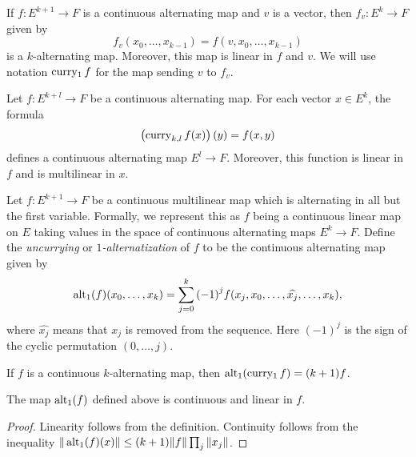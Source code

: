 \begin{definition}%
  \label{def:cont-alt-curry-fin}
  If \(f\colon E^{k + 1} \to F\) is a continuous alternating map and \(v\) is a vector,
  then \(f_{v}\colon E^{k} \to F\) given by
  \[
    f_{v}(x_{0}, \dots, x_{k - 1})=f(v, x_{0}, \dots, x_{k - 1})
  \]
  is a \(k\)-alternating map.
  Moreover, this map is linear in \(f\) and \(v\).
  We will use notation \(\operatorname{curry_1} f\) for the map sending \(v\) to \(f_{v}\).
\end{definition}

\begin{definition}%
  \label{def:cont-alt-curry-fin-add}
  Let \(f\colon E^{k + l} \to F\) be a continuous alternating map.
  For each vector \(x \in E^{k}\), the formula
  \[
    \left(\operatorname{curry}_{k,l} f(x)\right)(y) = f(x, y)
  \]
  defines a continuous alternating map \(E^{l}\to F\).
  Moreover, this function is linear in \(f\) and is multilinear in \(x\).
\end{definition}

\begin{definition}%
  \label{def:alt-one}
  Let \(f\colon E^{k + 1}\to F\) be a continuous multilinear map which is alternating in all but the first variable.
  Formally, we represent this as \(f\) being a continuous linear map on \(E\) taking values in the space of continuous alternating maps \(E^{k}\to F\).
  Define the \emph{uncurrying} or \emph{\(1\)-alternatization} of \(f\) to be the continuous alternating map given by
  \[
    \operatorname{alt_1}(f)(x_{0}, \dots, x_{k}) = \sum_{j=0}^{k}{(-1)}^{j}f(x_{j}, x_{0}, \dots, \widehat{x_{j}}, \dots, x_{k}),
  \]
  where \(\widehat{x_{j}}\) means that \(x_{j}\) is removed from the sequence.
  Here \({(-1)}^{j}\) is the sign of the cyclic permutation \((0, \dots, j)\).
\end{definition}

\begin{theorem}%
  \label{thm:uncurry-curry-one}
  If \(f\) is a continuous \(k\)-alternating map, then \(\operatorname{alt_1}(\operatorname{curry_1} f) = (k + 1)f\).
\end{theorem}

\begin{lemma}%
  \label{lem:alt-one-linear}
  The map \(\operatorname{alt_1}(f)\) defined above is continuous and linear in \(f\).
\end{lemma}
\begin{proof}
  Linearity follows from the definition.
  Continuity follows from the inequality \(\|\operatorname{alt_1}(f)(x)\|\le (k + 1)\|f\|\prod_{j}\|x_{j}\|\).
\end{proof}

